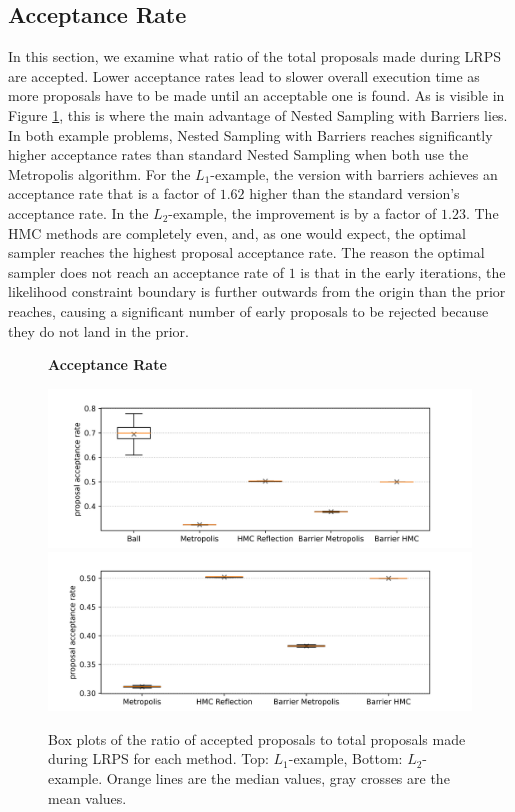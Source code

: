 \documentclass[12pt, a4paper]{report}
\begin{document}
\subsection{Acceptance Rate}
In this section, we examine what ratio of the total proposals made during LRPS are accepted.
Lower acceptance rates lead to slower overall execution time as more proposals have to be made until an acceptable one is found.
As is visible in Figure \ref{fig:results_acceptance_rates}, this is where the main advantage of Nested Sampling with Barriers lies.
In both example problems, Nested Sampling with Barriers reaches significantly higher acceptance rates than standard Nested Sampling when both use the Metropolis algorithm.
For the $L_1$-example, the version with barriers achieves an acceptance rate that is a factor of $1.62$ higher than the standard version's acceptance rate.
In the $L_2$-example, the improvement is by a factor of $1.23$.
The HMC methods are completely even, and, as one would expect, the optimal sampler reaches the highest proposal acceptance rate.
The reason the optimal sampler does not reach an acceptance rate of $1$ is that in the early iterations, the likelihood constraint boundary is further outwards from the origin than the prior reaches, causing a significant number of early proposals to be rejected because they do not land in the prior.
\begin{figure}
    \centering
    {\small \textbf{Acceptance Rate} \par}
    \includegraphics[scale=0.7]{figs/results/acceptance_rates_spike_20d.png}
    \includegraphics[scale=0.7]{figs/results/acceptance_rates_spike_offcenter_20d.png}
    \caption{Box plots of the ratio of accepted proposals to total proposals made during LRPS for each method. Top: $L_1$-example, Bottom: $L_2$-example. Orange lines are the median values, gray crosses are the mean values.}
    \label{fig:results_acceptance_rates}
\end{figure}
\end{document}
